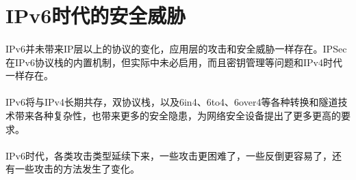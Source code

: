\documentclass[a4paper,14pt,openany]{article}
\begin{document}
\newpage
\section{IPv6时代的安全威胁}
\paragraph{}
IPv6并未带来IP层以上的协议的变化，应用层的攻击和安全威胁一样存在。IPSec在IPv6协议栈的内置机制，但实际中未必启用，而且密钥管理等问题和IPv4时代一样存在。
\paragraph{}
IPv6将与IPv4长期共存，双协议栈，以及6in4、6to4、6over4等各种转换和隧道技术带来各种复杂性，也带来更多的安全隐患，为网络安全设备提出了更多更高的要求。
\paragraph{}
IPv6时代，各类攻击类型延续下来，一些攻击更困难了，一些反倒更容易了，还有一些攻击的方法发生了变化。
\end{document}
